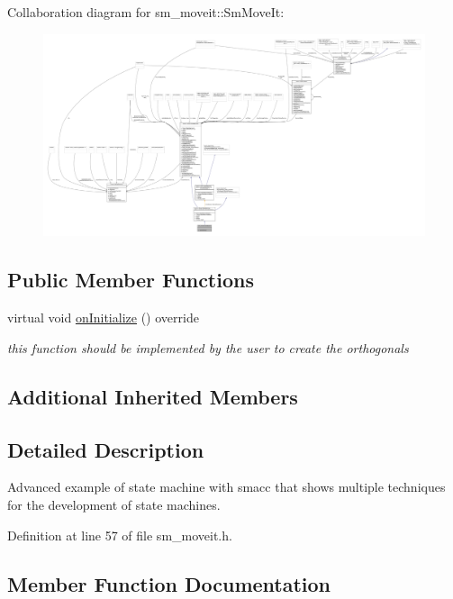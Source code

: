 Collaboration diagram for sm\+\_\+moveit\+:\+:Sm\+Move\+It\+:
\nopagebreak
\begin{figure}[H]
\begin{center}
\leavevmode
\includegraphics[width=350pt]{structsm__moveit_1_1SmMoveIt__coll__graph}
\end{center}
\end{figure}
\subsection*{Public Member Functions}
\begin{DoxyCompactItemize}
\item 
virtual void \hyperlink{structsm__moveit_1_1SmMoveIt_af2af89c1cb101214c2925b0818d74be5}{on\+Initialize} () override
\begin{DoxyCompactList}\small\item\em this function should be implemented by the user to create the orthogonals \end{DoxyCompactList}\end{DoxyCompactItemize}
\subsection*{Additional Inherited Members}


\subsection{Detailed Description}
Advanced example of state machine with smacc that shows multiple techniques for the development of state machines. 

Definition at line 57 of file sm\+\_\+moveit.\+h.



\subsection{Member Function Documentation}
\mbox{\label{structsm__moveit_1_1SmMoveIt_af2af89c1cb101214c2925b0818d74be5}} 
